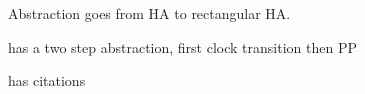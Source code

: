 Abstraction goes from HA to rectangular HA.
\cite{Henzinger1998,Raskin2005}

\cite{Henzinger1998} has a two step abstraction, first clock transition then PP

\cite{Raskin2005} has citations
